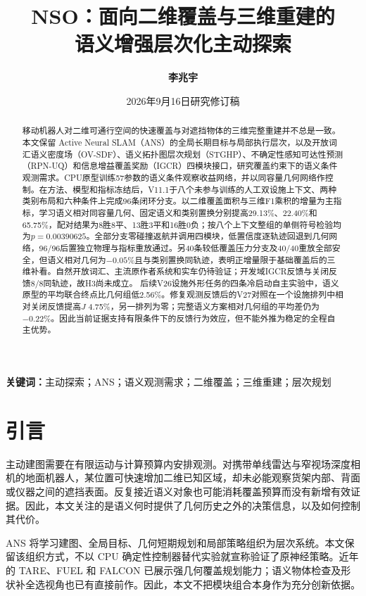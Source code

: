 \documentclass[11pt,a4paper]{article}
\title{\textbf{NSO：面向二维覆盖与三维重建的\\语义增强层次化主动探索}}
\author{\textbf{李兆宇}}
\date{2026年9月16日研究修订稿}
\begin{document}
\maketitle
\begin{abstract}
移动机器人对二维可通行空间的快速覆盖与对遮挡物体的三维完整重建并不总是一致。本文保留 Active Neural SLAM（ANS）的全局长期目标与局部执行层次，以及开放词汇语义密度场（OV-SDF）、语义拓扑图层次规划（STGHP）、不确定性感知可达性预测（RPN-UQ）和信息增益覆盖奖励（IGCR）四模块接口，研究覆盖约束下的语义条件观测需求。CPU原型训练57参数的语义条件观察收益网络，并以同容量几何网络作控制。在方法、模型和指标冻结后，V11.1于八个未参与训练的人工双设施上下文、两种类别布局和六种条件上完成96条闭环分支。以二维覆盖面积与三维F1乘积的增量为主指标，学习语义相对同容量几何、固定语义和类别置换分别提高29.13\%、22.40\%和65.75\%，配对结果为8胜8平、13胜3平和16胜0负；按八个上下文整组的单侧符号检验均为$p=0.00390625$。全部分支零碰撞返航并调用四模块，低置信度逐轨迹回退到几何网络，96/96后置独立物理与指标重放通过。另40条较低覆盖压力分支及40/40重放全部安全，但语义相对几何为$-0.05\%$且与类别置换同轨迹，表明正增量限于基础覆盖后的三维补看。自然开放词汇、主流原作者系统和实车仍待验证；开发域IGCR反馈与关闭反馈8/8同轨迹，故H3尚未成立。
后续V26设施外形任务的四条冷启动自主实验中，语义原型的平均联合终点比几何组低2.56\%。修复观测反馈后的V27对照在一个设施排列中相对关闭反馈提高$J$ 4.75\%，另一排列为零；完整语义方案相对几何组的平均差仍为$-0.22\%$。因此当前证据支持有限条件下的反馈行为效应，但不能外推为稳定的全程自主优势。\end{abstract}
\textbf{关键词：}主动探索；ANS；语义观测需求；二维覆盖；三维重建；层次规划
\linespread{1.25}\selectfont

\section{引言}
主动建图需要在有限运动与计算预算内安排观测。对携带单线雷达与窄视场深度相机的地面机器人，某位置可快速增加二维已知区域，却未必能观察货架内部、背面或仪器之间的遮挡表面。反复接近语义对象也可能消耗覆盖预算而没有新增有效证据。因此，本文关注的是语义何时提供了几何历史之外的决策信息，以及如何控制其代价。

ANS 将学习建图、全局目标、几何短期规划和局部策略组织为层次系统\cite{chaplot2020}。本文保留该组织方式，不以 CPU 确定性控制器替代实验就宣称验证了原神经策略。近年的 TARE、FUEL 和 FALCON 已展示强几何覆盖规划能力\cite{cao2021tare,zhou2021fuel,zhang2025falcon}；语义物体检查及形状补全选视角也已有直接前作\cite{papatheodorou2023finding,menon2023nbvsc,zhan2025panoramic}。因此，本文不把模块组合本身作为充分创新依据。
\end{document}

